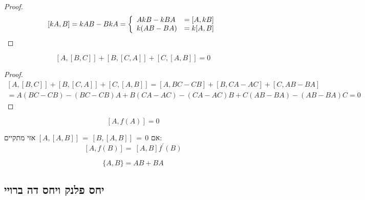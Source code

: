 \documentclass{tstextbook}
\begin{document}
\begin{proof}
$$[k A,B]=k A B-B k A={\left\{\begin{array}{l l}{A k B-k B A}&{=[A,k B]}\\ {k(A B-B A)}&{=k[A,B]}\end{array}\right.}$$

\end{proof}
\begin{proposition}
$$[A,[B,C]]+[B,[C,A]]+[C,[A,B]]=0$$

\end{proposition}
\begin{proof}
$$\begin{array}{l}{{[A,[B,C]]+[B,[C,A]]+[C,[A,B]]=[A,B C-C B]+[B,C A-A C]+[C,A B-B A]}}\\ {{=A(B C-C B)-(B C-C B)A+B(C A-A C)-(C A-A C)B+C(A B-B A)-(A B-B A)C=0}}\end{array}$$

\end{proof}
\begin{proposition}
$$[A,f(A)]=0$$

\end{proposition}
אם \([A,[A,B]]\,=\,[B,[A,B]]\,=\,0\) אזי מתקיים:
$$\left[A,f\left(B\right)\right]=\ \left[A,B\right]f^{\prime}\left(B\right)$$

\begin{definition}
$$\{A,B\}=AB+BA$$

\end{definition}
\subsection{יחס פלנק ויחס דה ברויי}
\end{document}
